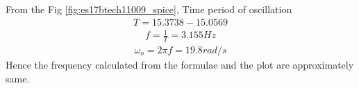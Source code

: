 \begin{enumerate}[label=\thesubsection.\arabic*.,ref=\thesubsection.\theenumi]
\begin{figure}[!ht]
\caption{}
\label{fig:es17btech11009_spice1}
\end{figure}
From the Fig \ref{fig:es17btech11009_spice},
Time period of oscillation 
\begin{align}
    T = 15.3738 - 15.0569
\end{align}
\begin{align}
    f = \frac{1}{T} = 3.155 Hz
\end{align}
\begin{align}
    \omega_{o} = 2\pi f = 19.8 rad/s
\end{align}
Hence the frequency calculated from the formulae and the plot are approximately same.
\end{enumerate}

